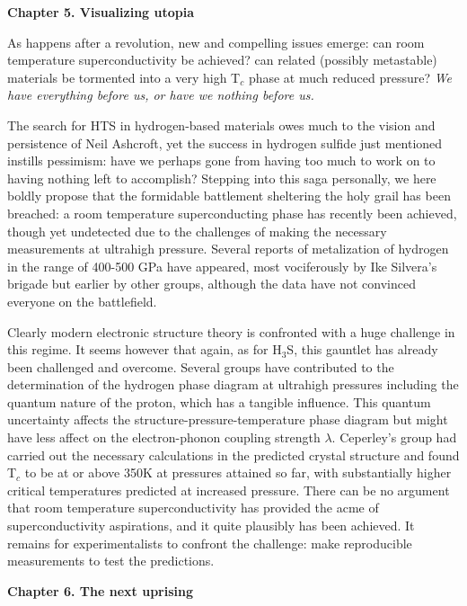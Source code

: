 \documentclass[aps,prb,twocolumn,groupedaddress]{revtex4}
\begin{document}
\begin{center}{\bf Chapter 5. Visualizing utopia} \end{center}

As happens after a revolution, new and compelling issues emerge: 
can room temperature superconductivity be achieved? can related (possibly 
metastable) materials be tormented into a very high T$_c$ phase at much 
reduced pressure?  {\it We have everything before us, or have we nothing 
before us.}

The search for HTS in hydrogen-based materials owes much to the vision and 
persistence of Neil Ashcroft,\cite{Ashcroft} yet the 
success in hydrogen sulfide just mentioned 
instills pessimism: have we perhaps gone from having too much to work on to 
having nothing left to accomplish? Stepping into this saga personally, we here 
boldly propose that the formidable battlement sheltering the 
holy grail has been 
breached: a room temperature superconducting phase has recently been achieved, 
though yet undetected due to the challenges of making the necessary measurements 
at ultrahigh pressure. Several reports of metalization of hydrogen in the range of 
400-500 GPa have appeared, most vociferously by Ike Silvera’s brigade\cite{Silvera} 
but earlier by other groups,\cite{Others} 
although the data have not convinced everyone on the battlefield. 

Clearly modern electronic structure theory is confronted with a 
huge challenge in this regime. It seems however that again, as for H$_3$S, this 
gauntlet has already been challenged and overcome. Several groups have 
contributed to the determination of the hydrogen phase diagram at ultrahigh 
pressures including the quantum nature of the proton, which has a tangible influence. 
This quantum uncertainty 
affects the structure-pressure-temperature phase diagram but might have less 
affect on the electron-phonon coupling strength $\lambda$. Ceperley's group 
had carried out the necessary calculations\cite{Ceperley} in the predicted crystal structure 
and found T$_c$ to be at or above 350K at pressures attained so far,
with substantially higher critical temperatures predicted at increased pressure. 
There can be no argument that room temperature superconductivity has provided 
the acme of superconductivity aspirations, and it quite plausibly has been 
achieved. It remains for experimentalists to confront the challenge: make 
reproducible measurements to test the predictions.  
 

\begin{center}{\bf Chapter 6. The next uprising}\end{center}
\end{document}
